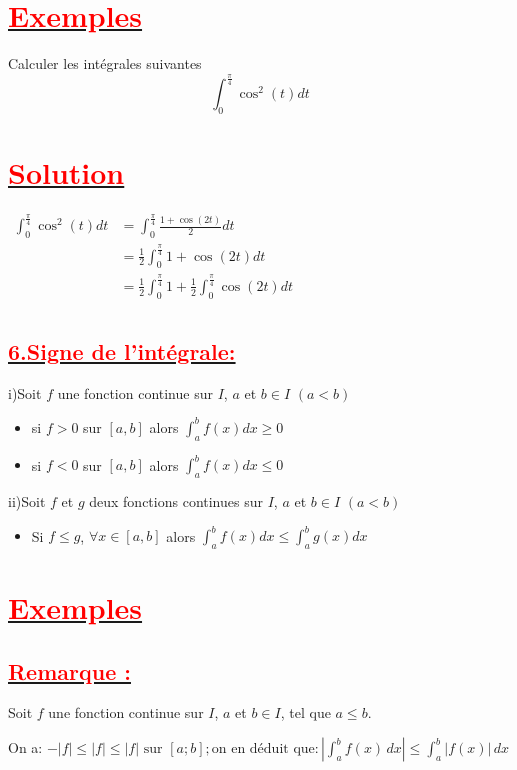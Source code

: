 \documentclass[12pt]{article}
\begin{document}
\section*{\underline{\textbf{\textcolor{red}{Exemples}}}}
Calculer les intégrales suivantes
\[ \int_0^{\frac{\pi}{4}}\cos^{2}(t)dt\]
\section*{\underline{\textbf{\textcolor{red}{Solution}}}}
\( 
\begin{aligned} 
\int_0^{\frac{\pi}{4}}\cos^{2}(t)dt &=\int_0^{\frac{\pi}{4}}\frac{1+\cos(2t)}{2}dt \\
&=\frac{1}{2}\int_0^{\frac{\pi}{4}}1+\cos(2t)dt \\
&=\frac{1}{2}\int_0^{\frac{\pi}{4}}1+\frac{1}{2}\int_0^{\frac{\pi}{4}}\cos(2t)dt \\
\end{aligned}
\)
\subsection*{\underline{\textbf{\textcolor{red}{6.Signe de l'intégrale:}}}}
i)Soit $f$ une fonction continue sur $I$, $a$ et $b\in I$  $(a<b)$
\begin{itemize}
\item si $f>0$ sur $[a,b]$ alors $\int_a^b f(x)dx \geq 0$
\item si $f<0$ sur $[a,b]$ alors $\int_a^b f(x)dx \leq 0$
\end{itemize}
ii)Soit $f$ et $g$ deux fonctions continues sur $I$, $a$ et $b\in I$  $(a<b)$
\begin{itemize}
\item Si $f \leq g$, $\forall x \in[a,b]$ alors $ \int_a^b f(x)dx \leq \int_a^b g(x)dx$
\end{itemize}
\section*{\underline{\textbf{\textcolor{red}{Exemples}}}}

\subsection*{\underline{\textbf{\textcolor{red}{Remarque :}}}}

Soit \( f \) une fonction continue sur \( I \), \( a \) et \( b \in I \), tel que \( a \leq b \).

On a: \( -|f| \leq |f| \leq |f| \text{ sur } [a ; b] ; \text{on en déduit que} : \left| \int_a^b f(x) \, dx \right| \leq \int_a^b |f(x)| \, dx\)
\end{document}
